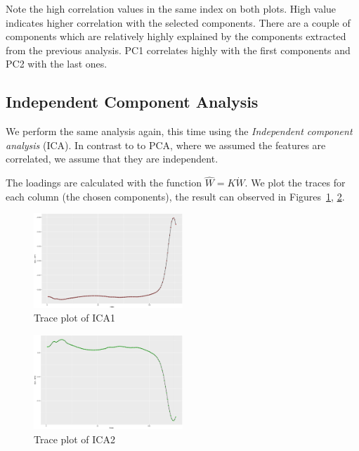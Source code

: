\documentclass[a4paper, twocolumn]{article}
\begin{document}
        Note the high correlation values in the same index on both plots. High value indicates higher correlation with the selected components. There are a couple of components which are relatively highly explained by the components extracted from the previous analysis. PC1 correlates highly with the first components and PC2 with the last ones. 


    \subsection*{Independent Component Analysis}

        We perform the same analysis again, this time using the \emph{Independent component analysis} (ICA). In contrast to to PCA, where we assumed the features are correlated, we assume that they are independent. 

        The loadings are calculated with the function \( \hat{W} = K \dot W \). We plot the traces for each column (the chosen components), the result can observed in Figures~\ref{fig:x750ical}, \ref{fig:x752ical}.

        \begin{figure}[h!]
            \centering
            \caption{Trace plot of ICA1}
            \label{fig:x750ical}
            \includegraphics[width=0.5\textwidth]{share/A2_trace_ICA1.eps}
        \end{figure}

        \begin{figure}[h!]
            \centering
            \caption{Trace plot of ICA2}
            \label{fig:x752ical}
            \includegraphics[width=0.5\textwidth]{share/A2_trace_ICA2.eps}
        \end{figure}
\end{document}
